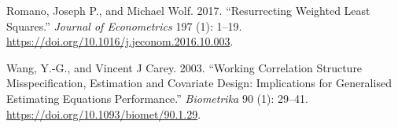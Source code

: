 \documentclass[12pt]{article}
\newlength{\cslhangindent}
\newlength{\cslentryspacingunit} %
\newenvironment{CSLReferences}[2] %
 {%
  \setlength{\parindent}{0pt}
  \ifodd #1
  \let\oldpar\par
  \def\par{\hangindent=\cslhangindent\oldpar}
  \fi
  \setlength{\parskip}{#2\cslentryspacingunit}
 }%
 {}
\begin{document}
\begin{CSLReferences}{1}{0}
\leavevmode{}%
Romano, Joseph P., and Michael Wolf. 2017. {``Resurrecting Weighted
Least Squares.''} \emph{Journal of Econometrics} 197 (1): 1--19.
\url{https://doi.org/10.1016/j.jeconom.2016.10.003}.

\leavevmode{}%
Wang, Y.-G., and Vincent J Carey. 2003. {``Working Correlation Structure
Misspecification, Estimation and Covariate Design: Implications for
Generalised Estimating Equations Performance.''} \emph{Biometrika} 90
(1): 29--41. \url{https://doi.org/10.1093/biomet/90.1.29}.

\end{CSLReferences}



\end{document}
